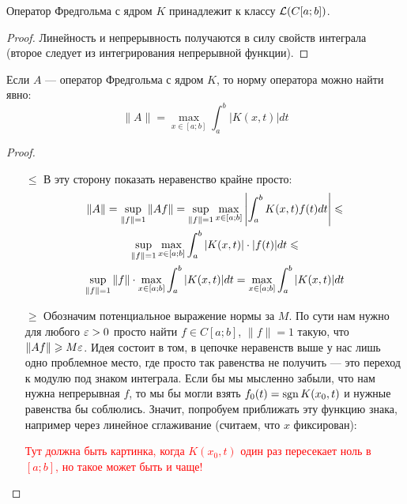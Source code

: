 \begin{proposition}
	Оператор Фредгольма с ядром $K$ принадлежит к классу $\mathcal{L}(C[a; b])$.
\end{proposition}

\begin{proof}
	Линейность и непрерывность получаются в силу свойств интеграла (второе следует из интегрирования непрерывной функции).
\end{proof}

\begin{proposition}
	Если $A$ --- оператор Фредгольма с ядром $K$, то норму оператора можно найти явно:
	\[
		\|A\| = \max_{x \in [a; b]} \int_a^b |K(x, t)|dt
	\]
\end{proposition}

\begin{proof}~
	\begin{itemize}
		\item[$\le$] В эту сторону показать неравенство крайне просто:
		\begin{multline*}
			\|A\| = \sup_{\|f\| = 1} \|Af\| = \sup_{\|f\| = 1} \max_{x \in [a; b]} \left|\int_a^b K(x, t)f(t)dt\right| \leqslant
			\\
			\sup_{\|f\| = 1} \max_{x \in [a; b]} \int_a^b |K(x, t)| \cdot |f(t)|dt \leqslant
			\\
			\sup_{\|f\| = 1} \|f\| \cdot \max_{x \in [a; b]} \int_a^b |K(x, t)|dt = \max_{x \in [a; b]} \int_a^b |K(x, t)|dt
		\end{multline*}
		
		\item[$\ge$] Обозначим потенциальное выражение нормы за $M$. По сути нам нужно для любого $\varepsilon > 0$ просто найти $f \in C[a; b]$, $\|f\| = 1$ такую, что $\|Af\| \geqslant M\varepsilon$. Идея состоит в том, в цепочке неравенств выше у нас лишь одно проблемное место, где просто так равенства не получить --- это переход к модулю под знаком интеграла. Если бы мы мысленно забыли, что нам нужна непрерывная $f$, то мы бы могли взять $f_0(t) = \operatorname{sgn} K(x_0, t)$ и нужные равенства бы соблюлись. Значит, попробуем приближать эту функцию знака, например через линейное сглаживание (считаем, что $x$ фиксирован):
		
		\textcolor{red}{Тут должна быть картинка, когда $K(x_0, t)$ один раз пересекает ноль в $[a; b]$, но такое может быть и чаще!}
		

\end{itemize}
\end{proof}
